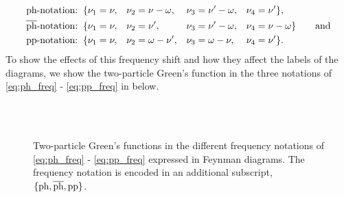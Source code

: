 \documentclass[\main/main.tex]{subfiles}
\begin{document}
\begin{subequations}
\begin{align}
	\text{ph-notation:}&\;\;\{\nu_1=\nu,&&\nu_2=\nu-\omega,&&\nu_3=\nu'-\omega,&&\nu_4=\nu'\},\label{eq:ph_freq}\\
	\overline{\text{ph}}\text{-notation:}&\;\;\{\nu_1=\nu,&&\nu_2=\nu',&&\nu_3=\nu'-\omega,&&\nu_4=\nu-\omega\}\qquad\text{and}\label{eq:ph_bar_freq}\\
	\text{pp-notation:}&\;\;\{\nu_1=\nu,&&\nu_2=\omega-\nu',&&\nu_3=\omega-\nu,&&\nu_4=\nu'\}.\label{eq:pp_freq}
\end{align}
\end{subequations}
To show the effects of this frequency shift and how they affect the labels of the diagrams, we show the two-particle Green's function in the three notations of \eqref{eq:ph_freq} - \eqref{eq:pp_freq} in  below.
\begin{figure}[h]
  \centering
  \vspace{0.5cm}\\
  \vspace{0.5cm}\\
  \caption{Two-particle Green's functions in the different frequency notations of \eqref{eq:ph_freq} - \eqref{eq:pp_freq} expressed in Feynman diagrams. The frequency notation is encoded in an additional subscript, $\{\text{ph}, \overline{\text{ph}},\text{pp}\}$.}
  \label{fig:two_particle_green_channels}
\end{figure}
\end{document}
